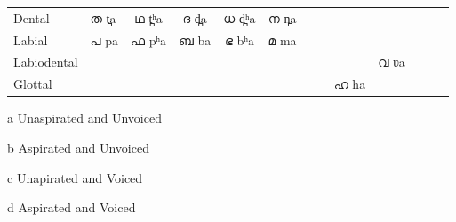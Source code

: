 \documentclass{ieeeaccess}
\begin{document}
\begin{table}
\begin{center}
\begin{threeparttable}
\begin{tabular*}{\textwidth}{@{\extracolsep{\fill}}llccccccccccc@{\extracolsep{\fill}}}
				Dental                       & {\mal ത} {\ipa t̪a}                                         & {\mal ഥ} {\ipa t̪ʰa} & {\mal ദ} {\ipa d̪a}  & {\mal ധ} {\ipa d̪ʰa} & {\mal ന} {\ipa n̪a} &              &             &             &                           \\

				Labial                       & {\mal പ} {\ipa pa}                                         & {\mal ഫ} {\ipa pʰa} & {\mal ബ} {\ipa ba}  & {\mal ഭ} {\ipa bʰa} & {\mal മ} {\ipa ma} &              &             &             &                           \\

				Labiodental                  &                                                     &              &              &              &             &              &             &             & {\mal വ} {\ipa ʋa}               \\
				Glottal                      &                                                     &              &              &              &             &              &             & {\mal ഹ} {\ipa ha} &                           \\
				\hline
			\end{tabular*}
       \begin{tablenotes}
       \item [a] Unaspirated and Unvoiced        \item [b] Aspirated and Unvoiced \item [c] Unapirated and Voiced \item [d] Aspirated and Voiced
       \end{tablenotes}

  \end{threeparttable}	
  \end{center}
\end{table}
\end{document}
